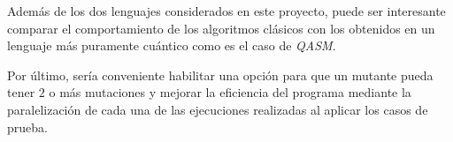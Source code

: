 Además de los dos lenguajes considerados en este proyecto, puede ser  interesante comparar el comportamiento de los algoritmos clásicos  con los obtenidos en un lenguaje más puramente cuántico como es el caso de  \textit{QASM}.

Por último, sería conveniente habilitar una opción para que un mutante pueda tener $2$ o más mutaciones y mejorar la eficiencia del programa mediante la paralelización de cada una de las ejecuciones realizadas al aplicar los casos de prueba.


